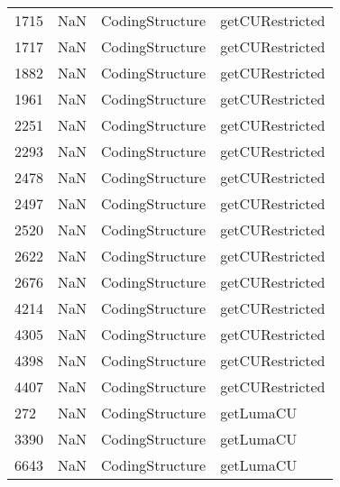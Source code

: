 \begin{tabular}{llll}
1715 &                   NaN &            CodingStructure &                           getCURestricted \\
1717 &                   NaN &            CodingStructure &                           getCURestricted \\
1882 &                   NaN &            CodingStructure &                           getCURestricted \\
1961 &                   NaN &            CodingStructure &                           getCURestricted \\
2251 &                   NaN &            CodingStructure &                           getCURestricted \\
2293 &                   NaN &            CodingStructure &                           getCURestricted \\
2478 &                   NaN &            CodingStructure &                           getCURestricted \\
2497 &                   NaN &            CodingStructure &                           getCURestricted \\
2520 &                   NaN &            CodingStructure &                           getCURestricted \\
2622 &                   NaN &            CodingStructure &                           getCURestricted \\
2676 &                   NaN &            CodingStructure &                           getCURestricted \\
4214 &                   NaN &            CodingStructure &                           getCURestricted \\
4305 &                   NaN &            CodingStructure &                           getCURestricted \\
4398 &                   NaN &            CodingStructure &                           getCURestricted \\
4407 &                   NaN &            CodingStructure &                           getCURestricted \\
272  &                   NaN &            CodingStructure &                                 getLumaCU \\
3390 &                   NaN &            CodingStructure &                                 getLumaCU \\
6643 &                   NaN &            CodingStructure &                                 getLumaCU \\

\end{tabular}

